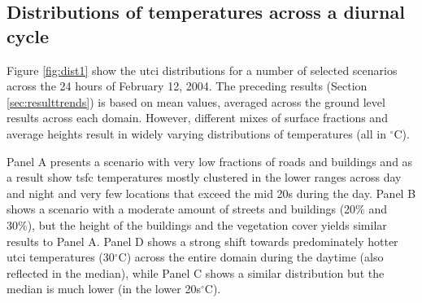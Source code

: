 \documentclass[final,3p,times,authoryear]{elsarticle}
\begin{document}
\subsection{Distributions of temperatures across a diurnal cycle}\label{sec:resultsdist}


Figure \ref{fig:dist1}  show the \gls{utci} distributions for a number of selected scenarios across the 24 hours of February 12, 2004. The preceding results (Section \ref{sec:resulttrends}) is based on mean values, averaged across the ground level results across each domain. However, different mixes of surface fractions and average heights result in widely varying distributions of temperatures (all in $^{\circ}$C). 


Panel A presents a scenario with very low fractions of roads and buildings and as a result show \gls{tsfc} temperatures mostly clustered in the lower ranges across day and night and very few locations that exceed the mid 20s during the day. Panel B shows a scenario with a moderate amount of streets and buildings (20\% and 30\%), but the height of the buildings and the vegetation cover yields similar results to Panel A. Panel D shows a strong shift towards predominately hotter \gls{utci} temperatures (30$^{\circ}$C) across the entire domain during the daytime (also reflected in the median), while Panel C shows a similar distribution but the median is much lower (in the lower 20s$^{\circ}$C).


 
\end{document}
